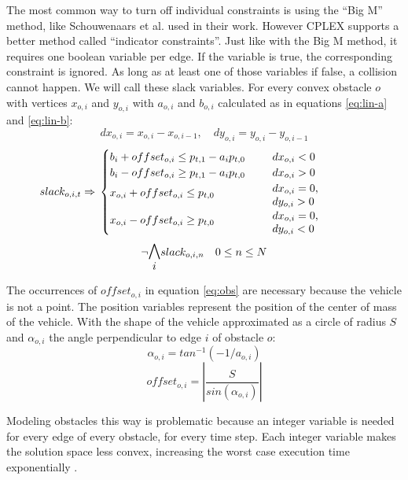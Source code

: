 The most common way to turn off individual constraints is using the ``Big M'' method, like Schouwenaars et al. \cite{Schouwenaars2001} used in their work. However CPLEX supports a better method called ``indicator constraints''. Just like with the Big M method, it requires one boolean variable per edge. If the variable is true, the corresponding constraint is ignored. As long as at least one of those variables if false, a collision cannot happen. We will call these slack variables. For every convex obstacle $o$ with vertices $x_{o,i}$ and $y_{o,i}$ with $a_{o,i}$ and $b_{o,i}$ calculated as in equations \ref{eq:lin-a} and \ref{eq:lin-b}:
\begin{equation*}
dx_{o,i} = x_{o,i} - x_{o,i-1}, \quad dy_{o,i} = y_{o,i} - y_{o,i-1}
\end{equation*}
\begin{equation}
\label{eq:obs}
slack_{o,i,t} \Rightarrow \\
\begin{cases}
b_i + offset_{o,i} \leq p_{t,1} - a_i p_{t,0} & dx_{o,i} < 0 \\
b_i - offset_{o,i}  \geq p_{t,1} - a_i p_{t,0} & dx_{o,i} > 0 \\
\parbox[t]{.4\columnwidth}{ \vspace{-0.25\baselineskip} $x_{o,i} + offset_{o,i}  \leq p_{t,0}$ } & \parbox[t]{.25\columnwidth}{ $dx_{o,i} = 0$, \\ $dy_{o,i} > 0$ } \\
\parbox[t]{.4\columnwidth}{ \vspace{-0.25\baselineskip} $x_{o,i} - offset_{o,i}  \geq p_{t,0}$ } & \parbox[t]{.25\columnwidth}{ $dx_{o,i} = 0$, \\ $dy_{o,i} < 0$ } \\

\end{cases}
\end{equation}
\begin{equation}
\neg \mathlarger{\mathlarger{\bigwedge_{i}}} slack_{o,i,n} \quad 0 \leq n \leq N
\end{equation}

The occurrences of $offset_{o,i}$ in equation \ref{eq:obs} are necessary because the vehicle is not a point. The position variables represent the position of the center of mass of the vehicle. With the shape of the vehicle approximated as a circle of radius $S$ and $\alpha_{o,i}$ the angle perpendicular to edge $i$ of obstacle $o$:
\begin{equation}
\alpha_{o,i} = tan^{-1}( -1 / a_{o,i})
\end{equation}
\begin{equation}
offset_{o,i} = |\dfrac{S}{sin(\alpha_{o,i})}|
\end{equation}

Modeling obstacles this way is problematic because an integer variable is needed for every edge of every obstacle, for every time step. Each integer variable makes the solution space less convex, increasing the worst case execution time exponentially \cite{DBLP:conf/coco/Karp72}.
